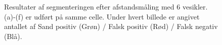 \begin{figure}[H]
  \hspace{0.1cm}
  \hspace{0.1cm}
  \caption{Resultater af segmenteringen efter afstandsmåling med 6 vesikler. (a)-(f) er udført på samme celle. Under hvert billede er angivet antallet af Sand positiv (Grøn) / Falsk positiv (Rød) / Falsk negativ (Blå).}
  \label{fig:animalsss}
\end{figure}

